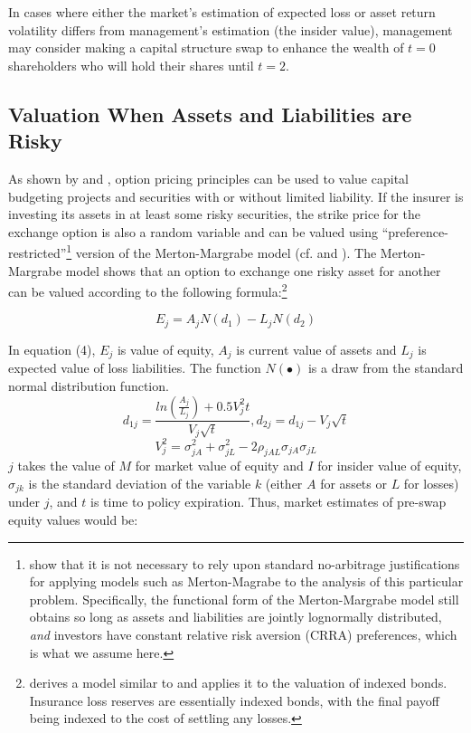 In cases where either the market's estimation of expected loss or asset return volatility differs from management's estimation (the insider value), management may consider making a capital structure swap to enhance the wealth of $t=0$ shareholders who will hold their shares until $t=2$.

\subsection{Valuation When Assets and Liabilities are Risky}

As shown by \citet{rubinstein1976a} and \citet{cox1979a}, 
option pricing principles
can be used to value capital budgeting projects and securities with or without limited liability. If the insurer is investing its assets in at least some risky securities, the strike price for the exchange option is also a random variable and can be valued using ``preference-restricted''\footnote{\citet{Stapleton1984} show that it is not necessary to rely upon standard no-arbitrage justifications for applying models such as Merton-Magrabe to the analysis of this particular problem. Specifically, the functional form of the Merton-Margrabe model still obtains so long as assets and liabilities are jointly lognormally distributed, \textit{and} investors have constant relative risk aversion (CRRA) preferences, which is what we assume here.} version of the Merton-Margrabe model (cf. \citet{merton1973a} and \citet{margrabe1978a}). The Merton-Margrabe model shows that an option to exchange one risky asset for another can be valued according to the following formula:\footnote{\citet{fischer1978a} derives a model similar to \citet{merton1973a} and applies it to the valuation of indexed bonds.  Insurance loss reserves are essentially indexed bonds, with the final payoff being indexed to the cost of settling any losses.} 

\begin{equation}\label{eqn:valuation}
E_j=A_j N\left(d_1 \right)-L_j N \left(d_2 \right)
\end{equation}

\noindent In equation (4), $E_j$ is value of equity, $A_j$ is current value of assets and $L_j$ is expected value of loss liabilities. The function $N \left(\bullet \right)$ is a draw from the standard normal distribution function.
\begin{displaymath}
d_{1j}=\frac{ln \left(\frac{A_j}{L_j} \right)+0.5 V_j^2 t}{V_j \sqrt{t}}, 
d_{2j}=d_{1j}-V_j \sqrt{t}
\end{displaymath}
\begin{displaymath}
V_j^2=\sigma_{jA}^2+\sigma_{jL}^2-2 \rho_{jAL}\sigma_{jA} \sigma_{jL}
\end{displaymath}
$j$ takes the value of $M$ for market value of equity and $I$ for insider value of equity, $\sigma_{jk}$ is the standard deviation of the variable $k$ (either $A$ for assets or $L$ for losses) under $j$, and $t$ is time to policy expiration. Thus, market estimates of pre-swap equity values would be:

